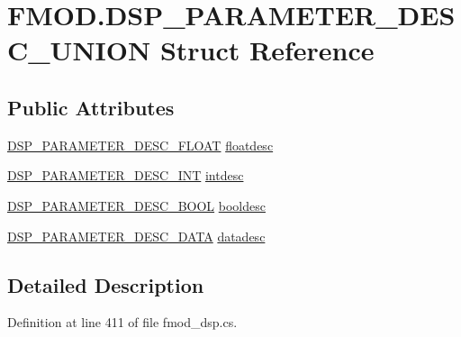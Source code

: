 \hypertarget{struct_f_m_o_d_1_1_d_s_p___p_a_r_a_m_e_t_e_r___d_e_s_c___u_n_i_o_n}{}\section{F\+M\+O\+D.\+D\+S\+P\+\_\+\+P\+A\+R\+A\+M\+E\+T\+E\+R\+\_\+\+D\+E\+S\+C\+\_\+\+U\+N\+I\+ON Struct Reference}
\label{struct_f_m_o_d_1_1_d_s_p___p_a_r_a_m_e_t_e_r___d_e_s_c___u_n_i_o_n}
\subsection*{Public Attributes}
\begin{DoxyCompactItemize}
\item 
\hyperlink{struct_f_m_o_d_1_1_d_s_p___p_a_r_a_m_e_t_e_r___d_e_s_c___f_l_o_a_t}{D\+S\+P\+\_\+\+P\+A\+R\+A\+M\+E\+T\+E\+R\+\_\+\+D\+E\+S\+C\+\_\+\+F\+L\+O\+AT} \hyperlink{struct_f_m_o_d_1_1_d_s_p___p_a_r_a_m_e_t_e_r___d_e_s_c___u_n_i_o_n_adbda3459ff41c5da3836123273703d94}{floatdesc}
\item 
\hyperlink{struct_f_m_o_d_1_1_d_s_p___p_a_r_a_m_e_t_e_r___d_e_s_c___i_n_t}{D\+S\+P\+\_\+\+P\+A\+R\+A\+M\+E\+T\+E\+R\+\_\+\+D\+E\+S\+C\+\_\+\+I\+NT} \hyperlink{struct_f_m_o_d_1_1_d_s_p___p_a_r_a_m_e_t_e_r___d_e_s_c___u_n_i_o_n_a7458a0c5ba30948b79ea17ca93c4a56a}{intdesc}
\item 
\hyperlink{struct_f_m_o_d_1_1_d_s_p___p_a_r_a_m_e_t_e_r___d_e_s_c___b_o_o_l}{D\+S\+P\+\_\+\+P\+A\+R\+A\+M\+E\+T\+E\+R\+\_\+\+D\+E\+S\+C\+\_\+\+B\+O\+OL} \hyperlink{struct_f_m_o_d_1_1_d_s_p___p_a_r_a_m_e_t_e_r___d_e_s_c___u_n_i_o_n_aadc444a6b255b4390345470b8a802064}{booldesc}
\item 
\hyperlink{struct_f_m_o_d_1_1_d_s_p___p_a_r_a_m_e_t_e_r___d_e_s_c___d_a_t_a}{D\+S\+P\+\_\+\+P\+A\+R\+A\+M\+E\+T\+E\+R\+\_\+\+D\+E\+S\+C\+\_\+\+D\+A\+TA} \hyperlink{struct_f_m_o_d_1_1_d_s_p___p_a_r_a_m_e_t_e_r___d_e_s_c___u_n_i_o_n_af1b9e17e7caedcf914a270225c953188}{datadesc}
\end{DoxyCompactItemize}


\subsection{Detailed Description}


Definition at line 411 of file fmod\+\_\+dsp.\+cs.



